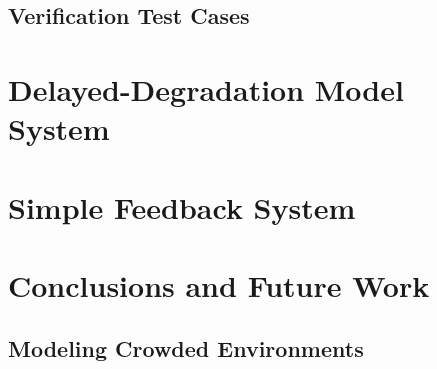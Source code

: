 \documentclass[english,letterpaper,12pt]{article}
\begin{document}
\begin{doublespacing}


\subsection{Verification Test Cases} %
\label{sub:verification}





\section{Delayed-Degradation Model System} %
\label{sec:delayed-deg}


\section{Simple Feedback System} %
\label{sec:experimental-system}


\section{Conclusions and Future Work} %
\label{sec:conclusions}

\subsection{Modeling Crowded Environments} %
\label{sub:diffusion-crowded}




\end{doublespacing}

\appendix



\end{document}

